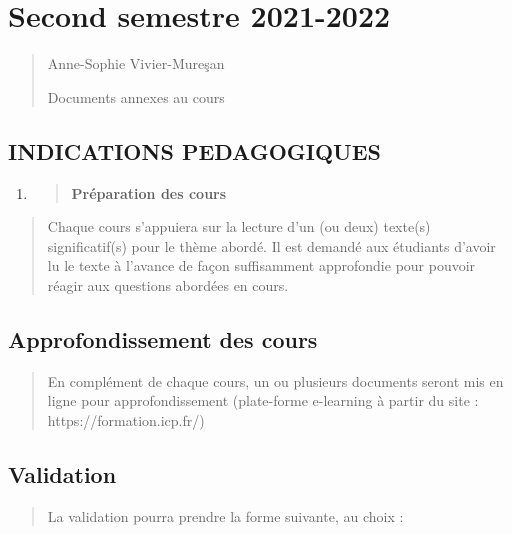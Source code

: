 \hypertarget{second-semestre-2021-2022}{%
\section{Second semestre 2021-2022}\label{second-semestre-2021-2022}}

\begin{quote}
Anne-Sophie Vivier-Mureşan

Documents annexes au cours
\end{quote}

\hypertarget{indications-pedagogiques}{%
\subsection{INDICATIONS PEDAGOGIQUES}\label{indications-pedagogiques}}

\begin{enumerate}
\def\labelenumi{\arabic{enumi}.}
\item
  \begin{quote}
  \textbf{Préparation des cours}
  \end{quote}
\end{enumerate}

\begin{quote}
Chaque cours s'appuiera sur la lecture d'un (ou deux) texte(s)
significatif(s) pour le thème abordé. Il est demandé aux étudiants
d'avoir lu le texte à l'avance de façon suffisamment approfondie pour
pouvoir réagir aux questions abordées en cours.
\end{quote}

\hypertarget{approfondissement-des-cours}{%
\subsection{Approfondissement des
cours}\label{approfondissement-des-cours}}

\begin{quote}
En complément de chaque cours, un ou plusieurs documents seront mis en
ligne pour approfondissement (plate-forme e-learning à partir du site :
{https://formation.icp.fr/})
\end{quote}

\hypertarget{validation}{%
\subsection{Validation}\label{validation}}

\begin{quote}
La validation pourra prendre la forme suivante, au choix :
\end{quote}

